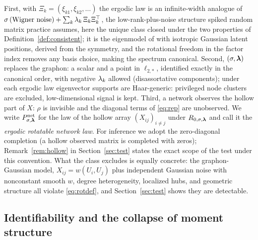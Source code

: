 First, with $\Xi_k=(\xi_{k1},\xi_{k2},\dots)$ the ergodic law is an
infinite-width analogue of $\sigma\,(\text{Wigner noise}) +
\sum_k\lambda_k\,\Xi_k\Xi_k^\top$, the low-rank-plus-noise structure
spiked random matrix practice assumes, here the unique class closed
under the two properties of Definition~\ref{def:consistent}; it is the
eigenmodel of \citet{hoff2008eigenmodel} with isotropic Gaussian
latent positions, derived from the symmetry, and the rotational
freedom in the factor index removes any basis choice, making the
spectrum canonical. Second,
$(\sigma,\bm{\lambda})$ replaces the graphon: a scalar and a point in $\ell_{2,*}$, identified exactly in the
canonical order, with negative $\lambda_k$ allowed (disassortative
components); under each ergodic law eigenvector supports are Haar-generic:
privileged node clusters are excluded, low-dimensional signal is kept. Third,
a network observes the hollow part of $X$: $\rho$ is invisible and the
diagonal terms of \eqref{eq:rep} are unobserved. We write $P^{\mathrm{net}}_{\sigma,\bm{\lambda}}$
for the law of the hollow array $(X_{ij})_{i\ne j}$ under
$R_{0,\sigma,\bm{\lambda}}$ and call it the \emph{ergodic rotatable network law}.
For inference we adopt the zero-diagonal completion (a hollow observed
matrix is completed with zeros); Remark~\ref{rem:hollow} in
Section~\ref{sec:test} states the exact scope of the test under this
convention. What the class excludes is equally concrete: the graphon-Gaussian model, $X_{ij}=w(U_i,U_j)$ plus independent
Gaussian noise with nonconstant smooth $w$, degree heterogeneity, localized hubs, and
geometric structure all violate \eqref{eq:rotdef}, and
Section~\ref{sec:test} shows they are detectable.



\subsection{Identifiability and the collapse of moment structure}

